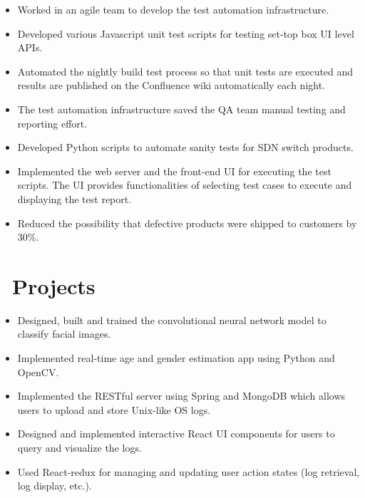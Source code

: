 \documentclass{resume}
\begin{document}
\begin{itemize}
	\item Worked in an agile team to develop the test automation infrastructure.
	\item Developed various Javascript unit test scripts for testing set-top box UI level APIs.
	\item Automated the nightly build test process so that unit tests are executed and results are published on the Confluence wiki automatically each night.
	\item The test automation infrastructure saved the QA team manual testing and reporting effort.
\end{itemize}

\begin{itemize}
	\item Developed Python scripts to automate sanity tests for SDN switch products.
	\item Implemented the web server and the front-end UI for executing the test scripts. The UI provides functionalities of selecting test cases to execute and displaying the test report.
	\item Reduced the possibility that defective products were shipped to customers by 30\%.
\end{itemize}

\section{\faUsers\ Projects}
\begin{itemize}
	\item Designed, built and trained the convolutional neural network model to classify facial images.
	\item Implemented real-time age and gender estimation app using Python and OpenCV. 
\end{itemize}

\begin{itemize}
	\item Implemented the RESTful server using Spring and MongoDB which allows users to upload and store Unix-like OS logs.
	\item Designed and implemented interactive React UI components for users to query and visualize the logs. 
	\item Used React-redux for managing and updating user action states (log retrieval, log display, etc.).
\end{itemize}
\end{document}
